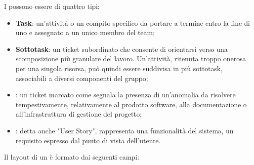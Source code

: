 \par I  possono essere di quattro tipi:
\begin{itemize}
  \item \textbf{Task}: un'attività o un compito specifico da portare a termine entro la fine di uno  e assegnato a un unico membro del team;
  \item \textbf{Sottotask}: un ticket subordinato che consente di orientarsi verso una scomposizione più granulare del lavoro. Un'attività, ritenuta troppo onerosa per una singola risorsa, può quindi essere suddivisa in più sottotask, associabili a diversi componenti del gruppo;
  \item \textbf{}: un ticket marcato come  segnala la presenza di un'anomalia da risolvere tempestivamente, relativamente al prodotto software, alla documentazione o all'infrastruttura di gestione del progetto;
  \item \textbf{}: detta anche "User Story", rappresenta una funzionalità del sistema, un requisito espresso dal punto di vista dell'utente.
\end{itemize}
\par Il layout di un  è formato dai seguenti campi:
